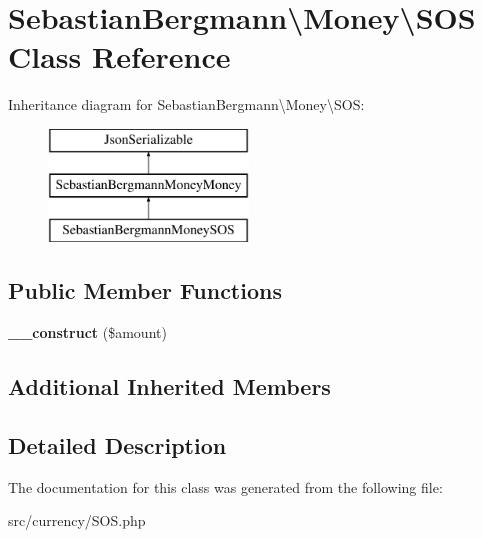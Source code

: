 \hypertarget{classSebastianBergmann_1_1Money_1_1SOS}{}\section{Sebastian\+Bergmann\textbackslash{}Money\textbackslash{}S\+O\+S Class Reference}
\label{classSebastianBergmann_1_1Money_1_1SOS}
Inheritance diagram for Sebastian\+Bergmann\textbackslash{}Money\textbackslash{}S\+O\+S\+:\begin{figure}[H]
\begin{center}
\leavevmode
\includegraphics[height=3.000000cm]{classSebastianBergmann_1_1Money_1_1SOS}
\end{center}
\end{figure}
\subsection*{Public Member Functions}
\begin{DoxyCompactItemize}
\item 
\hypertarget{classSebastianBergmann_1_1Money_1_1SOS_a5d75b80533d9aac58f105b87b69a0272}{}{\bfseries \+\_\+\+\_\+construct} (\$amount)\label{classSebastianBergmann_1_1Money_1_1SOS_a5d75b80533d9aac58f105b87b69a0272}

\end{DoxyCompactItemize}
\subsection*{Additional Inherited Members}


\subsection{Detailed Description}


The documentation for this class was generated from the following file\+:\begin{DoxyCompactItemize}
\item 
src/currency/S\+O\+S.\+php\end{DoxyCompactItemize}
